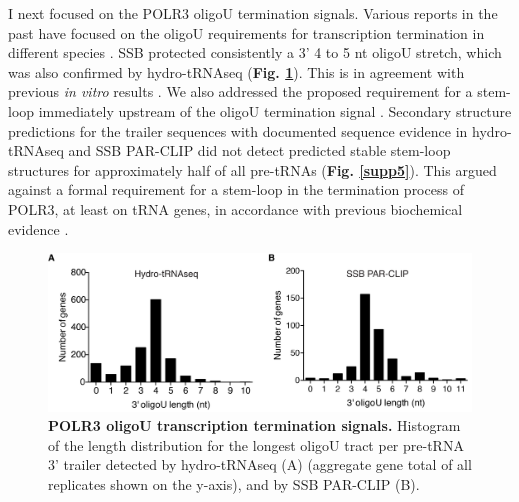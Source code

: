 \documentclass[12pt]{rockefeller}
\begin{document}
I next focused on the POLR3 oligoU termination signals. Various reports in the past have focused on the oligoU requirements for transcription termination in different species \cite{Nielsen:2013be,Arimbasseri:2014hj}. SSB protected consistently a 3’ 4 to 5 nt oligoU stretch, which was also confirmed by hydro-tRNAseq (\textbf{Fig. \ref{paper6de}}). This is in agreement with previous \textit{in vitro} results \cite{Bayfield:2009cx,Stefano:1984wp,Teplova:2006dv}. We also addressed the proposed requirement for a stem-loop immediately upstream of the oligoU termination signal \cite{Nielsen:2013be}. Secondary structure predictions for the trailer sequences with documented sequence evidence in hydro-tRNAseq and SSB PAR-CLIP did not detect predicted stable stem-loop structures for approximately half of all pre-tRNAs (\textbf{Fig. \ref{supp5}}). This argued against a formal requirement for a stem-loop in the termination process of POLR3, at least on tRNA genes, in accordance with previous biochemical evidence \cite{Arimbasseri:2014hj}.


\begin{figure}[!ht]%
\centering
\includegraphics[width=\textwidth]{paper6de.png}%
\caption[POLR3 oligoU transcription termination signals]
{\textbf{POLR3 oligoU transcription termination signals.}
Histogram of the length distribution for the longest oligoU tract per pre-tRNA 3’ trailer detected by hydro-tRNAseq (A) (aggregate gene total of all replicates shown on the y-axis), and by SSB PAR-CLIP (B).}
\centering
\label{paper6de}%
\end{figure}
\end{document}
